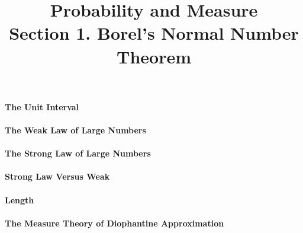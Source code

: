 \documentclass[12pt]{article}
\title{Probability and Measure \\ Section 1. Borel's Normal Number Theorem}
\begin{document}
	\paragraph{The Unit Interval}
	
	\paragraph{The Weak Law of Large Numbers}
	
	\paragraph{The Strong Law of Large Numbers}
	
	\paragraph{Strong Law Versus Weak}
	
	\paragraph{Length}
	
	\paragraph{The Measure Theory of Diophantine Approximation}
\end{document}
